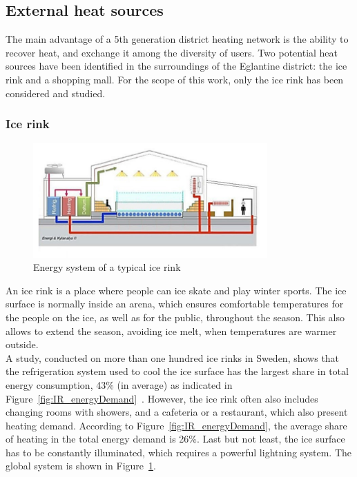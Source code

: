 \documentclass{article}
\begin{document}
\subsection{External heat sources}
The main advantage of a 5th generation district heating network is the ability to recover heat, and exchange it among the diversity of users. 
Two potential heat sources have been identified in the surroundings of the Eglantine district: the ice rink and a shopping mall. For the scope of this work, only the ice rink has been considered and studied.

\subsubsection{Ice rink}

\begin{figure}[htp]
	\centering
	\includegraphics[width=0.8\textwidth]{IR_schema.JPG}
	\caption{Energy system of a typical ice rink~\cite{gronqvistComparativeLifecycleCost2016}}
	\label{fig:IR_schema}
\end{figure}

An ice rink is a place where people can ice skate and play winter sports. The ice surface is normally inside an arena, which ensures comfortable temperatures for the people on the ice, as well as for the public, throughout the season. This also allows to extend the season, avoiding ice melt, when temperatures are warmer outside.\\

A study, conducted on more than one hundred ice rinks in Sweden, shows that the refrigeration system used to cool the ice surface has the largest share in total energy consumption, 43\% (in average) as indicated in Figure~\ref{fig:IR_energyDemand}~\cite{kolasniewskiEvaluationModellingIce2017}.
However, the ice rink often also includes changing rooms with showers, and a cafeteria or a restaurant, which also present heating demand. According to Figure~\ref{fig:IR_energyDemand}, the average share of heating in the total energy demand is 26\%.
Last but not least, the ice surface has to be constantly illuminated, which requires a powerful lightning system. The global system is shown in Figure~\ref{fig:IR_schema}.\\
\end{document}
